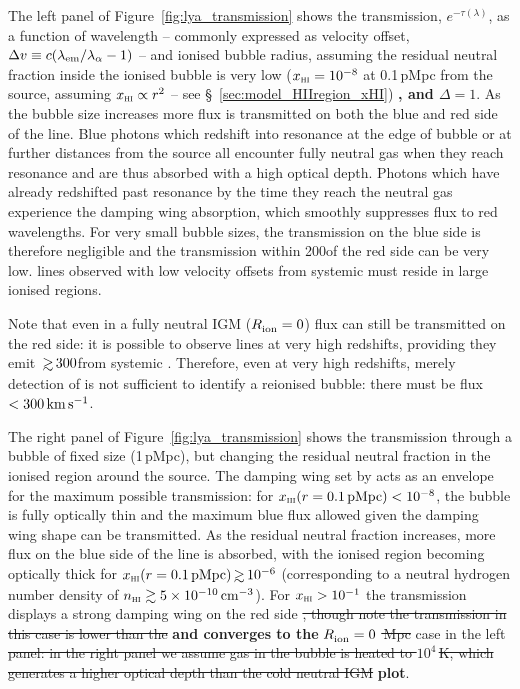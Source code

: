 \documentclass[fleqn,usenatbib]{mnras}
\providecommand{\DIFadd}[1]{{\protect\color{Green} {\bf #1}}} %
\providecommand{\DIFdel}[1]{{\protect\color{Gray} \scriptsize \sout{#1}}} %
\providecommand{\DIFaddbegin}{} %
\providecommand{\DIFaddend}{} %
\providecommand{\DIFdelbegin}{} %
\providecommand{\DIFdelend}{} %
\newcommand{\DIFscaledelfig}{0.5}
\newlength{\DIFdelgraphicswidth} %
\newlength{\DIFdelgraphicsheight} %
\newcommand{\DIFaddincludegraphics}[2][]{{\color{purple}\fbox{\DIFOincludegraphics[#1]{#2}}}} %
\newcommand{\DIFdelincludegraphics}[2][]{%
\sbox{\DIFdelgraphicsbox}{\DIFOincludegraphics[#1]{#2}}%
\settoboxwidth{\DIFdelgraphicswidth}{\DIFdelgraphicsbox} %
\settoboxtotalheight{\DIFdelgraphicsheight}{\DIFdelgraphicsbox} %
\scalebox{\DIFscaledelfig}{%
\parbox[b]{\DIFdelgraphicswidth}{\usebox{\DIFdelgraphicsbox}\\[-\baselineskip] \rule{\DIFdelgraphicswidth}{0em}}\llap{\resizebox{\DIFdelgraphicswidth}{\DIFdelgraphicsheight}{%
\setlength{\unitlength}{\DIFdelgraphicswidth}%
\begin{picture}(1,1)%
\thicklines\linethickness{2pt} %
{\color[rgb]{1,0,0}\put(0,0){\framebox(1,1){}}}%
{\color[rgb]{1,0,0}\put(0,0){\line( 1,1){1}}}%
{\color[rgb]{1,0,0}\put(0,1){\line(1,-1){1}}}%
\end{picture}%
}\hspace*{3pt}}} %
} %
\DeclareRobustCommand{\DIFaddbegin}{\DIFOaddbegin \let\includegraphics\DIFaddincludegraphics} %
\DeclareRobustCommand{\DIFaddend}{\DIFOaddend \let\includegraphics\DIFOincludegraphics} %
\DeclareRobustCommand{\DIFdelbegin}{\DIFOdelbegin \let\includegraphics\DIFdelincludegraphics} %
\DeclareRobustCommand{\DIFdelend}{\DIFOaddend \let\includegraphics\DIFOincludegraphics} %
\begin{document}
The left panel of Figure~\ref{fig:lya_transmission} shows the \lya transmission, $e^{-\tau(\lambda)}$, as a function of wavelength -- commonly expressed as velocity offset, $\DV \equiv c (\lambda_\mathrm{em} / \lambda_\alpha - 1)$ -- and ionised bubble radius, assuming the residual neutral fraction inside the ionised bubble is very low ($\xHI = 10^{-8}$ at 0.1\,pMpc from the source, assuming $\xHI \propto r^2$ -- see \S~\ref{sec:model_HIIregion_xHI})\DIFaddbegin \DIFadd{, and $\Delta=1$}\DIFaddend . As the bubble size increases more flux is transmitted on both the blue and red side of the line. Blue photons which redshift into resonance at the edge of bubble or at further distances from the source all encounter fully neutral gas when they reach resonance and are thus absorbed with a high optical depth. Photons which have already redshifted past resonance by the time they reach the neutral gas experience the damping wing absorption, which smoothly suppresses flux to red wavelengths. For very small bubble sizes, the transmission on the blue side is therefore negligible and the transmission within 200\kms of the red side can be very low. \lya lines observed with low velocity offsets from systemic must reside in large ionised regions. 

Note that even in a fully neutral IGM ($\Rion = 0$) \lya flux can still be transmitted on the red side: it is possible to observe \lya lines at very high redshifts, providing they emit \lya $\simgt300$\kms from systemic \citep{Dijkstra2011}. Therefore, even at very high redshifts, merely detection of \lya is not sufficient to identify a reionised bubble: there must be flux $<300\kms$.

The right panel of Figure~\ref{fig:lya_transmission} shows the transmission through a bubble of fixed size (1\,pMpc), but changing the residual neutral fraction in the ionised region around the source. The damping wing set by \Rion acts as an envelope for the maximum possible transmission: for $\xHI(r=0.1\,\mathrm{pMpc}) < 10^{-8}$, the bubble is fully optically thin and the maximum blue flux allowed given the damping wing shape can be transmitted. As the residual neutral fraction increases, more flux on the blue side of the line is absorbed, with the ionised region becoming optically thick for $\xHI(r=0.1\,\mathrm{pMpc}) \simgt 10^{-6}$ (corresponding to a neutral hydrogen number density of $n_\HI\gtrsim 5\times10^{-10}\cm^{-3}$). For $\xHI > 10^{-1}$ the transmission displays a strong damping wing on the red side \DIFdelbegin \DIFdel{, though note the transmission in this case is lower than the }\DIFdelend \DIFaddbegin \DIFadd{and converges to the }\DIFaddend $\Rion=0$ \DIFdelbegin \DIFdel{\,Mpc }\DIFdelend case in the left \DIFdelbegin \DIFdel{panel: in the right panel we assume gas in the bubble is heated to $10^4\,$K, which generates a higher optical depth than the cold neutral IGM}\DIFdelend \DIFaddbegin \DIFadd{plot}\DIFaddend .
\end{document}
